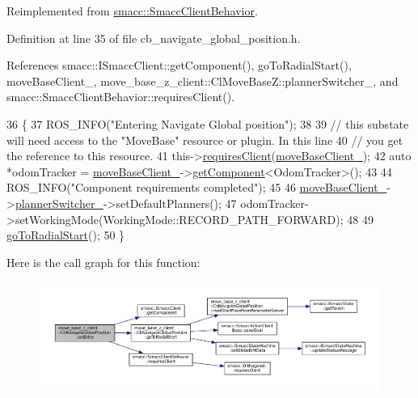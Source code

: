 Reimplemented from \hyperlink{classsmacc_1_1SmaccClientBehavior_a7962382f93987c720ad432fef55b123f}{smacc\+::\+Smacc\+Client\+Behavior}.



Definition at line 35 of file cb\+\_\+navigate\+\_\+global\+\_\+position.\+h.



References smacc\+::\+I\+Smacc\+Client\+::get\+Component(), go\+To\+Radial\+Start(), move\+Base\+Client\+\_\+, move\+\_\+base\+\_\+z\+\_\+client\+::\+Cl\+Move\+Base\+Z\+::planner\+Switcher\+\_\+, and smacc\+::\+Smacc\+Client\+Behavior\+::requires\+Client().


\begin{DoxyCode}
36   \{
37     ROS\_INFO(\textcolor{stringliteral}{"Entering Navigate Global position"});
38 
39     \textcolor{comment}{// this substate will need access to the "MoveBase" resource or plugin. In this line}
40     \textcolor{comment}{// you get the reference to this resource.}
41     this->\hyperlink{classsmacc_1_1SmaccClientBehavior_a917f001e763a1059af337bf4e164f542}{requiresClient}(\hyperlink{classmove__base__z__client_1_1CbNavigateGlobalPosition_a418cb1a461d6f28cb34908b739298657}{moveBaseClient\_});
42     \textcolor{keyword}{auto} *odomTracker = \hyperlink{classmove__base__z__client_1_1CbNavigateGlobalPosition_a418cb1a461d6f28cb34908b739298657}{moveBaseClient\_}->\hyperlink{classsmacc_1_1ISmaccClient_adef78db601749ca63c19e74a27cb88cc}{getComponent}<OdomTracker>();
43 
44     ROS\_INFO(\textcolor{stringliteral}{"Component requirements completed"});
45 
46     \hyperlink{classmove__base__z__client_1_1CbNavigateGlobalPosition_a418cb1a461d6f28cb34908b739298657}{moveBaseClient\_}->\hyperlink{classmove__base__z__client_1_1ClMoveBaseZ_ac57d2293bc0a5c4fcef326379822cc5e}{plannerSwitcher\_}->setDefaultPlanners();
47     odomTracker->setWorkingMode(WorkingMode::RECORD\_PATH\_FORWARD);
48 
49     \hyperlink{classmove__base__z__client_1_1CbNavigateGlobalPosition_abc8b9437cce7b86ec7acb07c463c90e5}{goToRadialStart}();
50   \}
\end{DoxyCode}


Here is the call graph for this function\+:
\nopagebreak
\begin{figure}[H]
\begin{center}
\leavevmode
\includegraphics[width=350pt]{classmove__base__z__client_1_1CbNavigateGlobalPosition_aa91be9e16bb3b67560e97c8d29c384e4_cgraph}
\end{center}
\end{figure}


